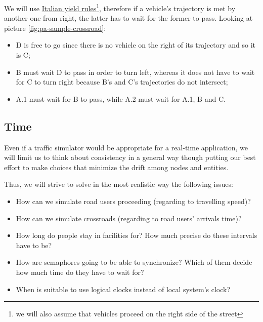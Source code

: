 We will use \href{http://www.aci.it/i-servizi/normative/codice-della-strada/titolo-v-norme-di-comportamento/art-145-precedenza.html}{Italian yield rules}\footnote{we will also assume that vehicles proceed on the right side of the
street}, therefore if a vehicle's trajectory is met by another one from right,
the latter has to wait for the former to pass. 
Looking at picture \ref{fig:pa-sample-crossroad}: 
\begin{itemize}
    \item D is free to go since there is no vehicle on the right of its trajectory and so it is C;
    \item B must wait D to pass in order to turn left, whereas it does not have to wait
for C to turn right because B's and C's trajectories do not intersect;
    \item A.1 must wait for B to pass, while A.2 must wait for A.1, B and C.
\end{itemize}

\subsection{Time}
Even if a traffic simulator would be appropriate for a real-time application,
we will limit us to think about consistency in a general way though putting our
best effort to make choices that minimize the drift among nodes and entities.

Thus, we will strive to solve in the most realistic way the following issues:

\begin{itemize}
\item How can we simulate road users proceeding (regarding to travelling
  speed)?
\item How can we simulate crossroads (regarding to road users' arrivals time)?
\item How long do people stay in facilities for? How much precise do these
  intervals have to be?
\item How are semaphores going to be able to synchronize? Which of them decide
  how much time do they have to wait for?
\item When is suitable to use logical clocks instead of local system's clock?
\end{itemize}
